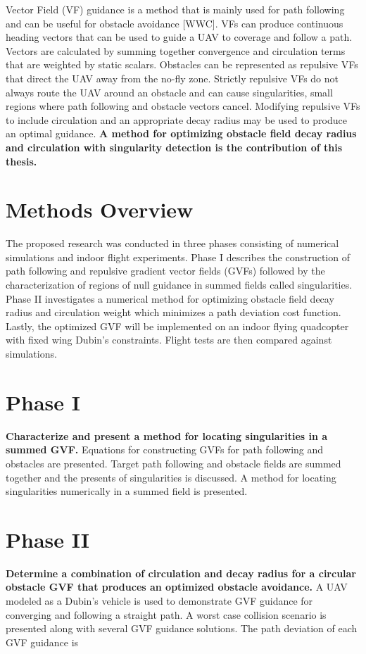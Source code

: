 \documentclass[numbered,pdftex]{ohio-etd}
\begin{document}
 

Vector Field (VF) guidance is a method that is mainly used for path following and can be useful for obstacle avoidance \cite{panagou_motion_2014}[WWC]. VFs can produce continuous heading vectors that can be used to guide a UAV to coverage and follow a path. Vectors are calculated by summing together convergence and circulation terms that are weighted by static scalars. Obstacles can be represented as repulsive VFs that direct the UAV away from the no-fly zone. Strictly repulsive VFs do not always route the UAV around an obstacle and can cause singularities, small regions where path following and obstacle vectors cancel. Modifying repulsive VFs to include circulation and an appropriate decay radius may be used to produce an optimal guidance. \textbf{A method for optimizing obstacle field decay radius and circulation with singularity detection is the contribution of this thesis.}
 \pagebreak
 
 \section{Methods Overview}
 
 The proposed research was conducted in three phases consisting of numerical simulations and indoor flight experiments. Phase I describes the construction of path following and repulsive gradient vector fields (GVFs) followed by the characterization of regions of null guidance in summed fields called singularities. Phase II investigates a numerical method for optimizing obstacle field decay radius and circulation weight which minimizes a path deviation cost function. Lastly, the optimized GVF will be implemented on an indoor flying quadcopter with fixed wing Dubin's constraints. Flight tests are then compared against simulations.
 

 \section{Phase I}
 \textbf{Characterize and present a method for locating singularities in a summed GVF.} Equations for constructing GVFs for path following and obstacles are presented. Target path following and obstacle fields are summed together and the presents of singularities is discussed. A method for locating singularities numerically in a summed field is presented.
 
 
 
 \section{Phase II}
 \textbf{Determine a combination of circulation and decay radius for a circular obstacle GVF that produces an optimized obstacle avoidance.} A UAV modeled as a Dubin's vehicle is used to demonstrate GVF guidance for converging and following a straight path. A worst case collision scenario is presented along with several GVF guidance solutions. The path deviation of each GVF guidance is 
 
\end{document}
